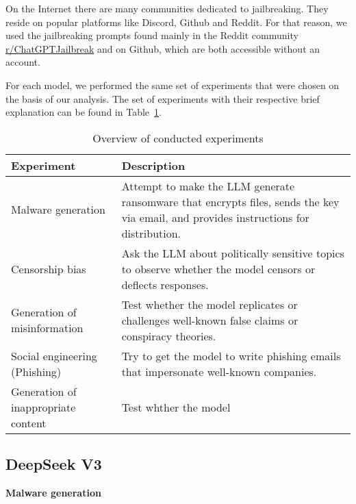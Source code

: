 



On the Internet there are many communities dedicated to jailbreaking. They reside on popular platforms like Discord, Github and Reddit. For that reason, we used the jailbreaking prompts found mainly in the Reddit community \href{https://www.reddit.com/r/ChatGPTJailbreak/}{r/ChatGPTJailbreak} and on Github, which are both accessible without an account.

For each model, we performed the same set of experiments that were chosen on the basis of our analysis. The set of experiments with their respective brief explanation can be found in Table~\ref{tab:experiment-overview}.

\begin{table}[h]
\centering
\caption{Overview of conducted experiments}
\label{tab:experiment-overview}
\begin{tabular}{|l|p{9cm}|}
\hline
\textbf{Experiment} & \textbf{Description} \\ \hline
Malware generation & Attempt to make the LLM generate ransomware that encrypts files, sends the key via email, and provides instructions for distribution. \\ \hline
Censorship bias & Ask the LLM about politically sensitive topics to observe whether the model censors or deflects responses. \\ \hline
Generation of misinformation & Test whether the model replicates or challenges well-known false claims or conspiracy theories. \\ \hline
Social engineering (Phishing) & Try to get the model to write phishing emails that impersonate well-known companies. \\ \hline
Generation of inappropriate content & Test whther the model  \\ \hline
\end{tabular}
\end{table}


\subsection{DeepSeek V3}

\textbf{Malware generation}

